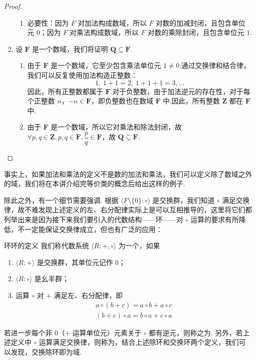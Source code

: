 \begin{proof}
\begin{enumerate}
\begin{enumerate}
        \item 必要性：因为 $F$ 对加法构成数域，所以 $F$ 对数的加减封闭，且包含单位元 $0$；因为 $F$ 对乘法构成数域，所以 $F$ 对数的乘除封闭，且包含单位元 $1$.
    \end{enumerate}

    \item 设 $\mathbf{F}$ 是一个数域，我们将证明 $\mathbf{Q} \subseteq \mathbf{F}$.
    \begin{enumerate}
        \item 由于 $\mathbf{F}$ 是一个数域，它至少包含乘法单位元 $1 \neq 0$.通过交换律和结合律，我们可以反复使用加法构造正整数：
        \[
        1, \ 1 + 1 = 2, \ 1 + 1 + 1 = 3, \dots
        \]
        因此，所有正整数都属于 $\mathbf{F}$.对于负整数，由于加法逆元的存在性，对于每个正整数 $n$，$-n \in \mathbf{F}$，即负整数也在数域 $\mathbf{F}$ 中.因此，所有整数 $\mathbf{Z}$ 都在 $\mathbf{F}$ 中.
        \item 由于 $\mathbf{F}$ 是一个数域，所以它对乘法和除法封闭，故 $\forall p,q \in \mathbf{Z}, p,q \in \mathbf{F}, \dfrac{p}{q} \in \mathbf{F}$，故 $\mathbf{Q} \subseteq \mathbf{F}$.
    \end{enumerate}
\end{enumerate}
\end{proof}

事实上，如果加法和乘法的定义不是数的加法和乘法，我们可以定义除了数域之外的域，我们将在本讲介绍完等价类的概念后给出这样的例子.

除此之外，有一个细节需要强调. 根据 $\langle F\setminus\{0\}\colon\circ\rangle$ 是交换群，我们知道 $\circ$ 满足交换律，故不难发现上述定义的左、右分配律实际上是可以互相推导的，这里将它们都列举出来是因为接下来我们要引入的代数结构——环——对 $\circ$ 运算的要求有所降低，不一定能保证交换律成立，但也有广泛的应用：

\begin{definition}{环}{环的定义} 
    我们称代数系统 $\langle R\colon+,\circ\rangle$ 为一个，如果
    \begin{enumerate}
        \item $\langle R\colon+\rangle$ 是交换群，其单位元记作 $0$；

        \item $\langle R\colon\circ\rangle$ 是幺半群；

        \item 运算 $\circ$ 对 $+$ 满足左、右分配律，即
              \begin{gather*}
                  a \circ (b + c) = a \circ b + a \circ c \\
                  (b + c) \circ a = b \circ a + c \circ a
              \end{gather*}
    \end{enumerate}

    若进一步每个非 $0$（$+$ 运算单位元）元素关于 $\circ$ 都有逆元，则称之为. 另外，若上述定义中 $\circ$ 运算满足交换律，则称为，结合上述除环和交换环两个定义，我们可以发现，交换除环即为域.
\end{definition}

